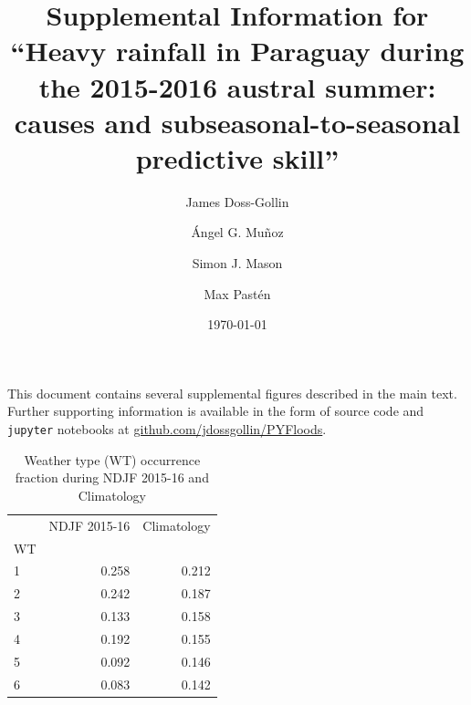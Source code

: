 \documentclass{article}
\title{Supplemental Information for\\``Heavy rainfall in Paraguay during the 2015-2016 austral summer: causes and subseasonal-to-seasonal predictive skill''}
\author{James Doss-Gollin\and \'{A}ngel G. Mu\~{n}oz  \and Simon J. Mason \and Max Past\'{e}n }
\date{\today}
\begin{document}
\maketitle

This document contains several supplemental figures described in the main text.
Further supporting information is available in the form of source code and \texttt{jupyter} notebooks at \url{github.com/jdossgollin/PYFloods}.

\listoftables
\listoffigures

\clearpage

\begin{table}
	\centering
	\begin{tabular}{lrr}
	\toprule
	{} &  NDJF 2015-16 &  Climatology \\
	WT &           &              \\
	\midrule
	1     &  0.258 &     0.212 \\
	2     &  0.242 &     0.187 \\
	3     &  0.133 &     0.158 \\
	4     &  0.192 &     0.155 \\
	5     &  0.092 &     0.146 \\
	6     &  0.083 &     0.142 \\
	\bottomrule
	\end{tabular}
	\caption{Weather type (WT) occurrence fraction during NDJF 2015-16 and Climatology}
\end{table}

\clearpage
\end{document}
